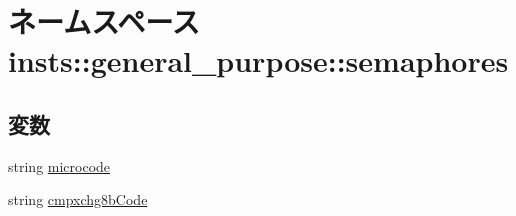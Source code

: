 \hypertarget{namespaceinsts_1_1general__purpose_1_1semaphores}{
\section{ネームスペース insts::general\_\-purpose::semaphores}
\label{namespaceinsts_1_1general__purpose_1_1semaphores}
}
\subsection*{変数}
\begin{DoxyCompactItemize}
\item 
string \hyperlink{namespaceinsts_1_1general__purpose_1_1semaphores_a770f11a173e99389a8802f0107ed8f52}{microcode}
\item 
string \hyperlink{namespaceinsts_1_1general__purpose_1_1semaphores_a3f7d3be7638ef8680d08ee0cd7d5c229}{cmpxchg8bCode}
\end{DoxyCompactItemize}


